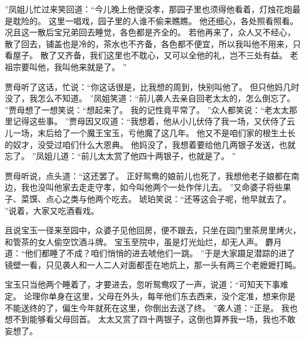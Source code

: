 ”凤姐儿忙过来笑回道：“今儿晚上他便没孝，那园子里也须得他看着，灯烛花炮最是耽险的。
这里一唱戏，园子里的人谁不偷来瞧瞧。
他还细心，各处照看照看。
况且这一散后宝兄弟回去睡觉，各色都是齐全的。
若他再来了，众人又不经心，散了回去，铺盖也是冷的，茶水也不齐备，各色都不便宜，所以我叫他不用来，只看屋子。
散了又齐备，我们这里也不耽心，又可以全他的礼，岂不三处有益。
老祖宗要叫他，我叫他来就是了。
”\par
贾母听了这话，忙说：“你这话很是，比我想的周到，快别叫他了。
但只他妈几时没了，我怎么不知道。
”凤姐笑道：“前儿袭人去亲自回老太太的，怎么倒忘了。
”贾母想了一想笑说：“想起来了。
我的记性竟平常了。
”众人都笑说：“老太太那里记得这些事。
”贾母因又叹道：“我想着，他从小儿伏侍了我一场，又伏侍了云儿一场，末后给了一个魔王宝玉，亏他魔了这几年。
他又不是咱们家的根生土长的奴才，没受过咱们什么大恩典。
他妈没了，我想着要给他几两银子发送，也就忘了。
”凤姐儿道：“前儿太太赏了他四十两银子，也就是了。
”\par
贾母听说，点头道：“这还罢了。
正好鸳鸯的娘前儿也死了，我想他老子娘都在南边，我也没叫他家去走走守孝，如今叫他两个一处作伴儿去。
”又命婆子将些果子、菜馔、点心之类与他两个吃去。
琥珀笑说：“还等这会子呢，他早就去了。
”说着，大家又吃酒看戏。
\par
且说宝玉一径来至园中，众婆子见他回房，便不跟去，只坐在园门里茶房里烤火，和管茶的女人偷空饮酒斗牌。
宝玉至院中，虽是灯光灿烂，却无人声。
麝月道：“他们都睡了不成？咱们悄悄的进去唬他们一跳。
”于是大家蹑足潜踪的进了镜壁一看，只见袭人和一人二人对面都歪在地炕上，那一头有两三个老嬷嬷打盹。
\par
宝玉只当他两个睡着了，才要进去，忽听鸳鸯叹了一声，说道：“可知天下事难定。
论理你单身在这里，父母在外头，每年他们东去西来，没个定准，想来你是不能送终的了，偏生今年就死在这里，你倒出去送了终。
”袭人道：“正是。
我也想不到能够看父母回首。
太太又赏了四十两银子，这倒也算养我一场，我也不敢妄想了。
